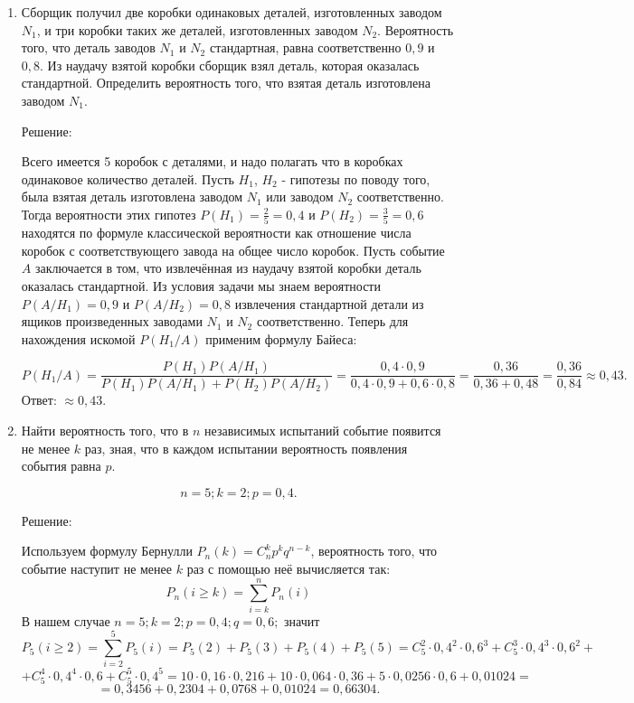 \documentclass{article}
\renewcommand{\ge}{\ensuremath{\geqslant}}
\begin{document}
\begin{enumerate}
\item %
Сборщик получил две коробки одинаковых деталей, изготовленных заводом $N_1$, и три коробки таких же деталей, изготовленных заводом $N_2$. Вероятность того, что деталь заводов $N_1$ и $N_2$ стандартная, равна соответственно $0,9$ и $0,8$. Из наудачу взятой коробки сборщик взял деталь, которая оказалась стандартной. Определить вероятность того, что взятая деталь изготовлена заводом $N_1$.
\begin{center}Решение:\end{center}
Всего имеется 5 коробок с деталями, и надо полагать что в коробках одинаковое количество деталей. \newline
Пусть $H_1$, $H_2$ - гипотезы по поводу того, была взятая деталь изготовлена заводом $N_1$ или заводом $N_2$ соответственно. \newline Тогда вероятности этих гипотез $P(H_1)=\frac{2}{5}=0,4$ и $P(H_2)=\frac{3}{5}=0,6$ находятся по формуле классической вероятности как отношение числа коробок с соответствующего завода на общее число коробок. \newline Пусть событие $A$ заключается в том, что извлечённая из наудачу взятой коробки деталь оказалась стандартной. \newline
Из условия задачи мы знаем вероятности $P(A/H_1)=0,9$ и $P(A/H_2)=0,8$ извлечения стандартной детали из ящиков произведенных заводами $N_1$ и $N_2$ соответственно. \newline
Теперь для нахождения искомой $P(H_1/A)$ применим формулу Байеса:

$$P(H_1/A)=\frac{P(H_1)P(A/H_1)}{P(H_1)P(A/H_1)+P(H_2)P(A/H_2)}=\frac{0,4\cdot0,9}{0,4\cdot0,9+0,6\cdot0,8}=\frac{0,36}{0,36+0,48}=\frac{0,36}{0,84}\approx0,43.$$
Ответ: $\approx0,43$.

\item %
Найти вероятность того, что в $n$ независимых испытаний событие появится не менее $k$ раз, зная, что в каждом испытании вероятность появления события равна $p$.

$$n=5; k=2; p=0,4.$$
\begin{center}Решение:\end{center}
Используем формулу Бернулли $P_n(k)=C_n^k p^k q^{n-k}$, вероятность того, что событие наступит не менее $k$ раз с помощью неё вычисляется так: $$P_n(i\ge k)=\sum_{i=k}^n P_n(i)$$
В нашем случае $n=5; k=2; p=0,4; q=0,6;$ значит
$$P_5(i\ge 2)=\sum_{i=2}^5 P_5(i)=P_5(2)+P_5(3)+P_5(4)+P_5(5)=C_5^2\cdot0,4^2\cdot0,6^3+C_5^3\cdot0,4^3\cdot0,6^2+$$
$$+C_5^4\cdot0,4^4\cdot0,6+C_5^5\cdot0,4^5=10\cdot0,16\cdot0,216+10\cdot0,064\cdot0,36+5\cdot0,0256\cdot0,6+0,01024=$$
$$=0,3456+0,2304+0,0768+0,01024=0,66304.$$


\end{enumerate}
\end{document}
